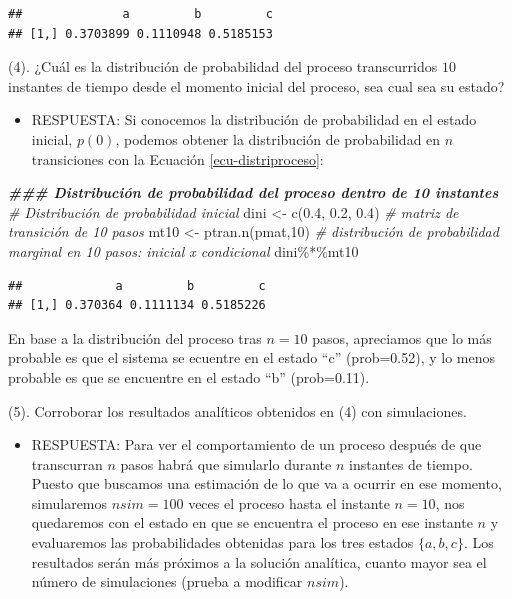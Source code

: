 \documentclass[
]{book}
\newenvironment{Shaded}{\begin{snugshade}}{\end{snugshade}}
\newcommand{\CommentTok}[1]{\textcolor[rgb]{0.56,0.35,0.01}{\textit{#1}}}
\newcommand{\DecValTok}[1]{\textcolor[rgb]{0.00,0.00,0.81}{#1}}
\newcommand{\DocumentationTok}[1]{\textcolor[rgb]{0.56,0.35,0.01}{\textbf{\textit{#1}}}}
\newcommand{\FloatTok}[1]{\textcolor[rgb]{0.00,0.00,0.81}{#1}}
\newcommand{\FunctionTok}[1]{\textcolor[rgb]{0.00,0.00,0.00}{#1}}
\newcommand{\NormalTok}[1]{#1}
\newcommand{\OtherTok}[1]{\textcolor[rgb]{0.56,0.35,0.01}{#1}}
\newcommand{\SpecialCharTok}[1]{\textcolor[rgb]{0.00,0.00,0.00}{#1}}
\providecommand{\tightlist}{%
  \setlength{\itemsep}{0pt}\setlength{\parskip}{0pt}}
\theoremstyle{definition}
\theoremstyle{definition}
\theoremstyle{definition}
\theoremstyle{definition}
\theoremstyle{remark}
\begin{document}
\begin{verbatim}
##              a         b         c
## [1,] 0.3703899 0.1110948 0.5185153
\end{verbatim}

(4). ¿Cuál es la distribución de probabilidad del proceso transcurridos \(10\) instantes de tiempo desde el momento inicial del proceso, sea cual sea su estado?

\begin{itemize}
\tightlist
\item
  RESPUESTA: Si conocemos la distribución de probabilidad en el estado inicial, \(p(0)\), podemos obtener la distribución de probabilidad en \(n\) transiciones con la Ecuación \ref{ecu-distriproceso}:
\end{itemize}

\begin{Shaded}
\begin{Highlighting}[]
\DocumentationTok{\#\#\# Distribución de probabilidad del proceso dentro de 10 instantes}
\CommentTok{\# Distribución de  probabilidad inicial}
\NormalTok{dini }\OtherTok{\textless{}{-}} \FunctionTok{c}\NormalTok{(}\FloatTok{0.4}\NormalTok{, }\FloatTok{0.2}\NormalTok{, }\FloatTok{0.4}\NormalTok{)}
\CommentTok{\# matriz de transición de 10 pasos}
\NormalTok{mt10 }\OtherTok{\textless{}{-}} \FunctionTok{ptran.n}\NormalTok{(pmat,}\DecValTok{10}\NormalTok{)}
\CommentTok{\# distribución de probabilidad marginal en 10 pasos: inicial x condicional}
\NormalTok{dini}\SpecialCharTok{\%*\%}\NormalTok{mt10}
\end{Highlighting}
\end{Shaded}

\begin{verbatim}
##             a         b         c
## [1,] 0.370364 0.1111134 0.5185226
\end{verbatim}

En base a la distribución del proceso tras \(n=10\) pasos, apreciamos que lo más probable es que el sistema se ecuentre en el estado ``c'' (prob=0.52), y lo menos probable es que se encuentre en el estado ``b'' (prob=0.11).

(5). Corroborar los resultados analíticos obtenidos en (4) con simulaciones.

\begin{itemize}
\tightlist
\item
  RESPUESTA: Para ver el comportamiento de un proceso después de que transcurran \(n\) pasos habrá que simularlo durante \(n\) instantes de tiempo. Puesto que buscamos una estimación de lo que va a ocurrir en ese momento, simularemos \(nsim=100\) veces el proceso hasta el instante \(n=10\), nos quedaremos con el estado en que se encuentra el proceso en ese instante \(n\) y evaluaremos las probabilidades obtenidas para los tres estados \(\{a,b,c\}\). Los resultados serán más próximos a la solución analítica, cuanto mayor sea el número de simulaciones (prueba a modificar \(nsim\)).
\end{itemize}
\end{document}
